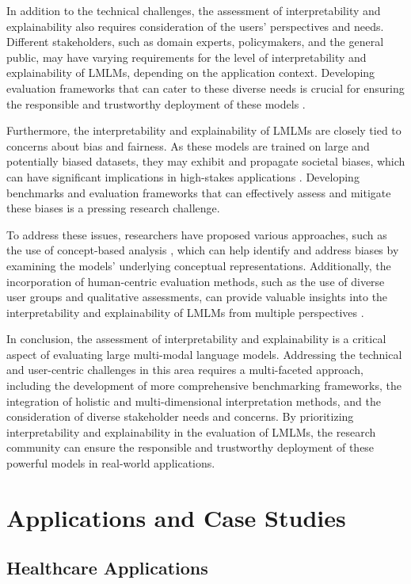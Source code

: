 \documentclass[11pt]{article}
\begin{document}
In addition to the technical challenges, the assessment of interpretability and explainability also requires consideration of the users' perspectives and needs. Different stakeholders, such as domain experts, policymakers, and the general public, may have varying requirements for the level of interpretability and explainability of LMLMs, depending on the application context. Developing evaluation frameworks that can cater to these diverse needs is crucial for ensuring the responsible and trustworthy deployment of these models \cite{ref186}.

Furthermore, the interpretability and explainability of LMLMs are closely tied to concerns about bias and fairness. As these models are trained on large and potentially biased datasets, they may exhibit and propagate societal biases, which can have significant implications in high-stakes applications \cite{ref187}. Developing benchmarks and evaluation frameworks that can effectively assess and mitigate these biases is a pressing research challenge.

To address these issues, researchers have proposed various approaches, such as the use of concept-based analysis \cite{ref183}, which can help identify and address biases by examining the models' underlying conceptual representations. Additionally, the incorporation of human-centric evaluation methods, such as the use of diverse user groups and qualitative assessments, can provide valuable insights into the interpretability and explainability of LMLMs from multiple perspectives \cite{ref186}.

In conclusion, the assessment of interpretability and explainability is a critical aspect of evaluating large multi-modal language models. Addressing the technical and user-centric challenges in this area requires a multi-faceted approach, including the development of more comprehensive benchmarking frameworks, the integration of holistic and multi-dimensional interpretation methods, and the consideration of diverse stakeholder needs and concerns. By prioritizing interpretability and explainability in the evaluation of LMLMs, the research community can ensure the responsible and trustworthy deployment of these powerful models in real-world applications.

\section{Applications and Case Studies}

\subsection{Healthcare Applications}
\end{document}
